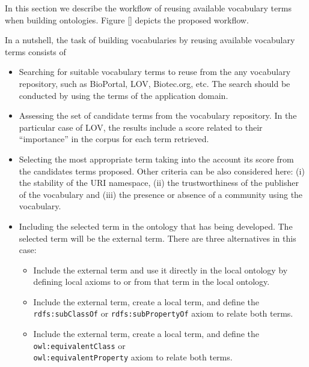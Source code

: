 
In this section we describe the workflow of reusing available vocabulary terms when building ontologies.
Figure \ref{} depicts the proposed workflow.



In a nutshell, the task of building vocabularies by reusing available vocabulary terms consists of

\begin{itemize}
	\item Searching for suitable vocabulary terms to reuse from the any vocabulary repository, such as BioPortal, LOV, Biotec.org, etc. The search should be conducted by using the terms of the application domain.
	\item Assessing the set of candidate terms from the vocabulary repository. In the particular case of LOV, the results include a score related to their ``importance'' in the corpus for each term retrieved.
	\item Selecting the most appropriate term taking into the account its score from the candidates terms proposed. Other criteria can be also considered here: (i) the stability of the URI namespace, (ii) the trustworthiness of the publisher of the vocabulary and (iii) the presence or absence of a community using the vocabulary.
	\item Including the selected term in the ontology that has being developed. The selected term will be the external term. There are three alternatives in this case: 
	\begin{itemize}
		\item Include the external term and use it directly in the local ontology by defining local axioms to or from that term in the local ontology.
		\item Include the external term, create a local term, and define the {\tt rdfs:subClassOf} or {\tt rdfs:subPropertyOf} axiom to relate both terms.
		\item Include the external term, create a local term, and define the {\tt owl:equivalentClass} or \\ {\tt owl:equivalentProperty} axiom to relate both terms. 				
	\end{itemize}
\end{itemize}

